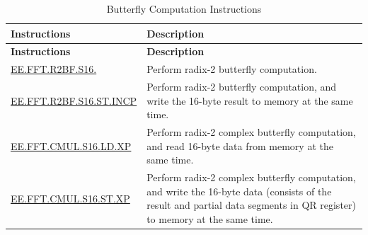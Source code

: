 \begin{longtable}[c]{|l|m{10cm}|}
    \caption{Butterfly Computation Instructions}
    \label{tab:pie-butterfly-instructions}\\
    \hline
    \rowcolor{lightgray}
    \textbf{Instructions} & \textbf{Description} \\\hline
    \endfirsthead
    \rowcolor{lightgray}
    \textbf{Instructions} & \textbf{Description} \\\hline
    \endhead
    \endfoot
    
    \hyperref[instruction:EEFFTR2BFS16]{EE.FFT.R2BF.S16.} & Perform radix-2 butterfly computation.
    \\\hline
    \hyperref[instruction:EEFFTR2BFS16STINCP]{EE.FFT.R2BF.S16.ST.INCP} & Perform radix-2 butterfly computation, and write the 16-byte result to memory at the same time.
    \\\hline
    \hyperref[instruction:EEFFTCMULS16LDXP]{EE.FFT.CMUL.S16.LD.XP} & Perform radix-2 complex butterfly computation, and read 16-byte data from memory at the same time.
    \\\hline
    \hyperref[instruction:EEFFTCMULS16STXP]{EE.FFT.CMUL.S16.ST.XP} & Perform radix-2 complex butterfly computation, and write the 16-byte data (consists of the result and partial data segments in QR register) to memory at the same time.
    \\\hline
\end{longtable}